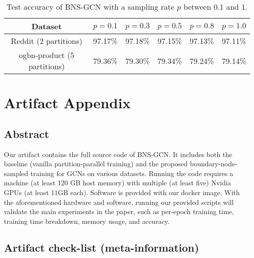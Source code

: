 \documentclass{article}
\begin{document}
\begin{table}[h]
\centering
\caption{Test accuracy of BNS-GCN with a sampling rate $p$ between 0.1 and 1.}
\label{tab:choice_of_p}
\begin{tabular}{c|ccccc}
\hline
Dataset & $p=0.1$ & $p=0.3$ & $p=0.5$ & $p=0.8$ & $p=1.0$ \\
\hline
Reddit (2 partitions) & 97.17\% & 97.18\% & 97.15\% & 97.13\%  & 97.11\%\\
\hline
ogbn-product (5 partitions) & 79.36\% & 79.30\% & 79.34\% & 79.24\% & 79.14\%\\
\hline
\end{tabular}
\end{table}

\clearpage
\section{Artifact Appendix} 
\subsection{Abstract}
Our artifact contains the full source code of BNS-GCN. 
It includes both the baseline (vanilla partition-parallel training) and the proposed boundary-node-sampled training for GCNs on various datasets.
Running the code requires a machine (at least 120 GB host memory) with multiple (at least five) Nvidia GPUs (at least 11GB each).
Software is provided with our docker image.
With the aforementioned hardware and software, running our provided scripts will validate the main experiments in the paper, such as per-epoch training time, training time breakdown, memory usage, and accuracy.

\subsection{Artifact check-list (meta-information)}
\end{document}
